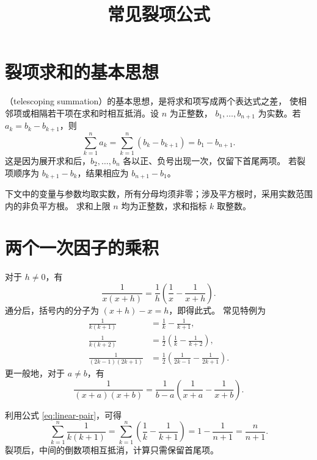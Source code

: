\documentclass[UTF8]{ctexart}
\title{常见裂项公式}
\author{}
\date{}
\begin{document}
\maketitle

\section{裂项求和的基本思想}

（telescoping summation）的基本思想，是将求和项写成两个表达式之差，
使相邻项或相隔若干项在求和时相互抵消。设 $n$ 为正整数，
$b_1,\ldots,b_{n+1}$ 为实数。若 $a_k=b_k-b_{k+1}$，则
\begin{equation}\label{eq:telescoping-basic}
  \sum_{k=1}^{n}a_k
  =\sum_{k=1}^{n}(b_k-b_{k+1})
  =b_1-b_{n+1}.
\end{equation}
这是因为展开求和后，$b_2,\ldots,b_n$ 各以正、负号出现一次，仅留下首尾两项。
若裂项顺序为 $b_{k+1}-b_k$，结果相应为 $b_{n+1}-b_1$。

下文中的变量与参数均取实数，所有分母均须非零；涉及平方根时，采用实数范围内的非负平方根。
求和上限 $n$ 均为正整数，求和指标 $k$ 取整数。

\section{两个一次因子的乘积}

对于 $h\ne0$，有
\begin{equation}\label{eq:linear-pair}
  \boxed{\frac1{x(x+h)}
  =\frac1h\left(\frac1x-\frac1{x+h}\right)}.
\end{equation}
通分后，括号内的分子为 $(x+h)-x=h$，即得此式。
常见特例为
\begin{align*}
  \frac1{k(k+1)}&=\frac1k-\frac1{k+1},\\
  \frac1{k(k+2)}&=\frac12\left(\frac1k-\frac1{k+2}\right),\\
  \frac1{(2k-1)(2k+1)}
  &=\frac12\left(\frac1{2k-1}-\frac1{2k+1}\right).
\end{align*}
更一般地，对于 $a\ne b$，有
\begin{equation}\label{eq:shifted-linear-pair}
  \boxed{\frac1{(x+a)(x+b)}
  =\frac1{b-a}\left(\frac1{x+a}-\frac1{x+b}\right)}.
\end{equation}

\begin{example}[相邻项抵消]
利用公式 \eqref{eq:linear-pair}，可得
\[
  \sum_{k=1}^{n}\frac1{k(k+1)}
  =\sum_{k=1}^{n}\left(\frac1k-\frac1{k+1}\right)
  =1-\frac1{n+1}=\frac{n}{n+1}.
\]
裂项后，中间的倒数项相互抵消，计算只需保留首尾项。
\end{example}
\end{document}
